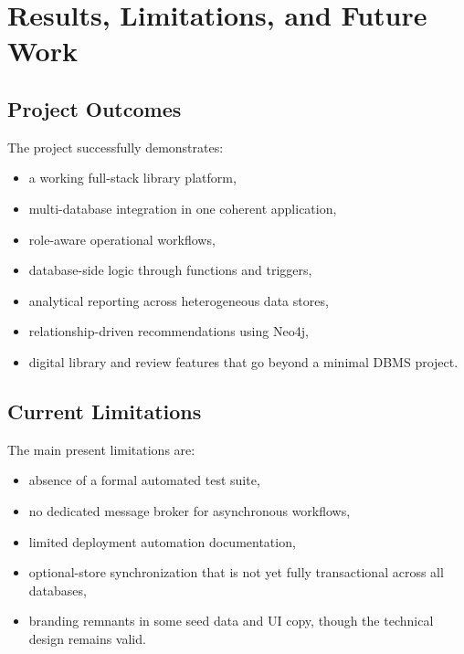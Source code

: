 \documentclass[12pt,a4paper]{report}
\begin{document}
\chapter{Results, Limitations, and Future Work}
\section{Project Outcomes}
The project successfully demonstrates:
\begin{itemize}[leftmargin=1.5em]
    \item a working full-stack library platform,
    \item multi-database integration in one coherent application,
    \item role-aware operational workflows,
    \item database-side logic through functions and triggers,
    \item analytical reporting across heterogeneous data stores,
    \item relationship-driven recommendations using Neo4j,
    \item digital library and review features that go beyond a minimal DBMS project.
\end{itemize}

\section{Current Limitations}
The main present limitations are:
\begin{itemize}[leftmargin=1.5em]
    \item absence of a formal automated test suite,
    \item no dedicated message broker for asynchronous workflows,
    \item limited deployment automation documentation,
    \item optional-store synchronization that is not yet fully transactional across all databases,
    \item branding remnants in some seed data and UI copy, though the technical design remains valid.
\end{itemize}
\end{document}
